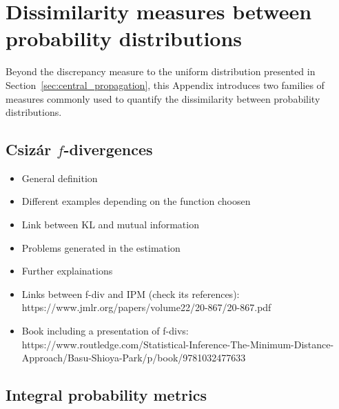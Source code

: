 \cleardoublepage
\chapter{Dissimilarity measures between probability distributions}
\label{apx:B}

Beyond the discrepancy measure to the uniform distribution presented in Section~\ref{sec:central_propagation}, this Appendix introduces two families of measures commonly used to quantify the dissimilarity between probability distributions.  


\section*{Csiz\'{a}r $f$-divergences}

\begin{itemize}
    \item General definition
    \item Different examples depending on the function choosen
    \item Link between KL and mutual information
    \item Problems generated in the estimation
    \item Further explainations 
\end{itemize}

\begin{itemize}
    \item Links between f-div and IPM (check its references): https://www.jmlr.org/papers/volume22/20-867/20-867.pdf
    \item Book including a presentation of f-divs: https://www.routledge.com/Statistical-Inference-The-Minimum-Distance-Approach/Basu-Shioya-Park/p/book/9781032477633
\end{itemize}


\section*{Integral probability metrics}

